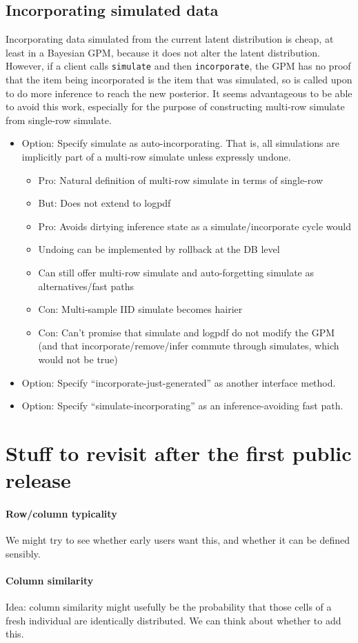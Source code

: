 \documentclass[10pt,letterpaper]{article}
\begin{document}
\subsection{Incorporating simulated data}

Incorporating data simulated from the current latent distribution is
cheap, at least in a Bayesian GPM, because it does not alter the
latent distribution.  However, if a client calls \texttt{simulate} and
then \texttt{incorporate}, the GPM has no proof that the item being
incorporated is the item that was simulated, so is called upon to do
more inference to reach the new posterior.  It seems advantageous to
be able to avoid this work, especially for the purpose of constructing
multi-row simulate from single-row simulate.

\begin{itemize}
\item Option: Specify simulate as auto-incorporating.  That is,
all simulations are implicitly part of a multi-row simulate unless
expressly undone.
\begin{itemize}
\item Pro: Natural definition of multi-row simulate in terms of single-row
\item But: Does not extend to logpdf
\item Pro: Avoids dirtying inference state as a simulate/incorporate cycle
  would
\item Undoing can be implemented by rollback at the DB level
\item Can still offer multi-row simulate and auto-forgetting simulate as
  alternatives/fast paths
\item Con: Multi-sample IID simulate becomes hairier
\item Con: Can't promise that simulate and logpdf do not modify the GPM
  (and that incorporate/remove/infer commute through simulates, which
  would not be true)
\end{itemize}
\item Option: Specify ``incorporate-just-generated'' as another
  interface method.
\item Option: Specify ``simulate-incorporating'' as an
  inference-avoiding fast path.
\end{itemize}

\appendix
\section{Stuff to revisit after the first public release}

\paragraph{Row/column typicality}
We might try to see whether early users want this, and whether it can
be defined sensibly.

\paragraph{Column similarity}
Idea: column similarity might usefully be the probability that those
cells of a fresh individual are identically distributed.  We can think
about whether to add this.
\end{document}
